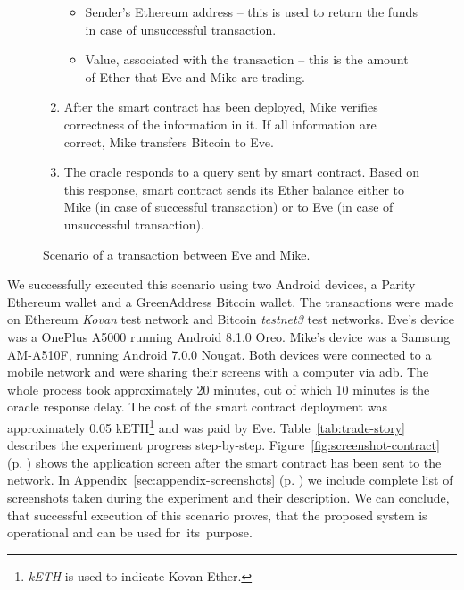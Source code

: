 \begin{figure}[ht]
\begin{framed}
\begin{enumerate}[noitemsep]
            \begin{itemize}[nolistsep,noitemsep]
                \item Sender's Ethereum address -- this is used to return the funds in case of unsuccessful transaction.
                \item Value, associated with the transaction -- this is the amount of Ether that Eve and Mike are trading.
            \end{itemize}
        \item After the smart contract has been deployed, Mike verifies correctness of the information in it. If all information are correct, Mike transfers Bitcoin to Eve.
        \item The oracle responds to a query sent by smart contract. Based on this response, smart contract sends its Ether balance either to Mike (in case of successful transaction) or to Eve (in case of unsuccessful transaction).
    \end{enumerate}
    \end{framed}
    \caption{Scenario of a transaction between Eve and Mike.}
    \label{fig:transaction-scenario}
\end{figure}

We successfully executed this scenario using two Android devices, a Parity Ethereum wallet and a GreenAddress Bitcoin wallet. The transactions were made on Ethereum \textit{Kovan} test network and Bitcoin \textit{testnet3} test networks. Eve's device was a OnePlus A5000 running Android 8.1.0 Oreo. Mike's device was a Samsung AM-A510F, running Android 7.0.0 Nougat. Both devices were connected to a mobile network and were sharing their screens with a computer via \acrshort{adb}. The whole process took approximately 20 minutes, out of which 10 minutes is the oracle response delay. The cost of the smart contract deployment was approximately 0.05 kETH\footnote{\textit{kETH} is used to indicate Kovan Ether.} and was paid by Eve\footnotemark. Table~\ref{tab:trade-story} describes the experiment progress step-by-step. Figure~\ref{fig:screenshot-contract} (p. \pageref{fig:screenshot-contract}) shows the application screen after the smart contract has been sent to the network. In Appendix~\ref{sec:appendix-screenshots} (p. \pageref{sec:appendix-screenshots}) we include complete list of screenshots taken during the experiment and their description. We can conclude, that successful execution of this scenario proves, that the proposed system is operational and can be used for~its~purpose.
% 

